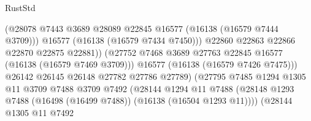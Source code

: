 \begin{lexlean}{RustStd}
\begin{coremodule}
                                              (@28078
                                                @7443
                                                @3689
                                                @28089
                                                @22845
                                                @16577
                                                (@16138 (@16579 @7444 @3709)))
                                              @16577
                                              (@16138 (@16579 @7434 @7450)))
                                            @22860
                                            @22863
                                            @22866
                                            @22870
                                            @22875
                                            @22881))
                                        (@27752
                                          @7468
                                          @3689
                                          @27763
                                          @22845
                                          @16577
                                          (@16138 (@16579 @7469 @3709)))
                                        @16577
                                        (@16138 (@16579 @7426 @7475)))
                                      @26142
                                      @26145
                                      @26148
                                      @27782
                                      @27786
                                      @27789)
                                    (@27795
                                      @7485
                                      @1294
                                      @1305
                                      @11
                                      @3709
                                      @7488
                                      @3709
                                      @7492
                                      (@28144
                                        @1294
                                        @11
                                        @7488
                                        (@28148
                                          @1293
                                          @7488
                                          (@16498 (@16499 @7488))
                                          (@16138 (@16504 @1293 @11))))
                                      (@28144
                                        @1305
                                        @11
                                        @7492

\end{coremodule}
\end{lexlean}
